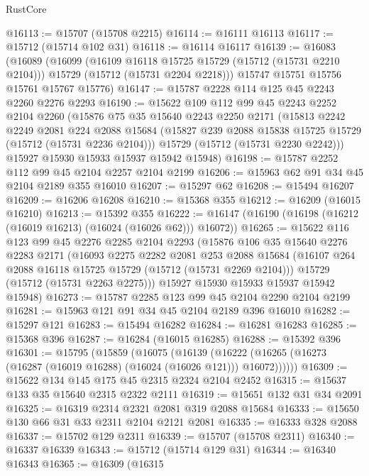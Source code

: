 \begin{lexlean}{RustCore}
\begin{coremodule}
@16113 := @15707 (@15708 @2215)
@16114 := @16111 @16113
@16117 := @15712 (@15714 @102 @31)
@16118 := @16114 @16117
@16139 := @16083
    (@16089
      (@16099
        (@16109 @16118 @15725 @15729 (@15712 (@15731 @2210 @2104)))
        @15729
        (@15712 (@15731 @2204 @2218)))
      @15747
      @15751
      @15756
      @15761
      @15767
      @15776)
@16147 := @15787 @2228 @114 @125 @45 @2243 @2260 @2276 @2293
@16190 := @15622
    @109
    @112
    @99
    @45
    @2243
    @2252
    @2104
    @2260
    (@15876
      @75
      @35
      @15640
      @2243
      @2250
      @2171
      (@15813
        @2242
        @2249
        @2081
        @224
        @2088
        @15684
        (@15827 @239 @2088 @15838 @15725 @15729 (@15712 (@15731 @2236 @2104)))
        @15729
        (@15712 (@15731 @2230 @2242)))
      @15927
      @15930
      @15933
      @15937
      @15942
      @15948)
@16198 := @15787 @2252 @112 @99 @45 @2104 @2257 @2104 @2199
@16206 := @15963 @62 @91 @34 @45 @2104 @2189 @355 @16010
@16207 := @15297 @62
@16208 := @15494 @16207
@16209 := @16206 @16208
@16210 := @15368 @355
@16212 := @16209 (@16015 @16210)
@16213 := @15392 @355
@16222 := @16147 (@16190 (@16198 (@16212 (@16019 @16213) (@16024 (@16026 @62))) @16072))
@16265 := @15622
    @116
    @123
    @99
    @45
    @2276
    @2285
    @2104
    @2293
    (@15876
      @106
      @35
      @15640
      @2276
      @2283
      @2171
      (@16093
        @2275
        @2282
        @2081
        @253
        @2088
        @15684
        (@16107 @264 @2088 @16118 @15725 @15729 (@15712 (@15731 @2269 @2104)))
        @15729
        (@15712 (@15731 @2263 @2275)))
      @15927
      @15930
      @15933
      @15937
      @15942
      @15948)
@16273 := @15787 @2285 @123 @99 @45 @2104 @2290 @2104 @2199
@16281 := @15963 @121 @91 @34 @45 @2104 @2189 @396 @16010
@16282 := @15297 @121
@16283 := @15494 @16282
@16284 := @16281 @16283
@16285 := @15368 @396
@16287 := @16284 (@16015 @16285)
@16288 := @15392 @396
@16301 := @15795
    (@15859
      (@16075
        (@16139 (@16222 (@16265 (@16273 (@16287 (@16019 @16288) (@16024 (@16026 @121))) @16072))))))
@16309 := @15622 @134 @145 @175 @45 @2315 @2324 @2104 @2452
@16315 := @15637 @133 @35 @15640 @2315 @2322 @2111
@16319 := @15651 @132 @31 @34 @2091
@16325 := @16319 @2314 @2321 @2081 @319 @2088 @15684
@16333 := @15650 @130 @66 @31 @33 @2311 @2104 @2121 @2081
@16335 := @16333 @328 @2088
@16337 := @15702 @129 @2311
@16339 := @15707 (@15708 @2311)
@16340 := @16337 @16339
@16343 := @15712 (@15714 @129 @31)
@16344 := @16340 @16343
@16365 := @16309
    (@16315

\end{coremodule}
\end{lexlean}
